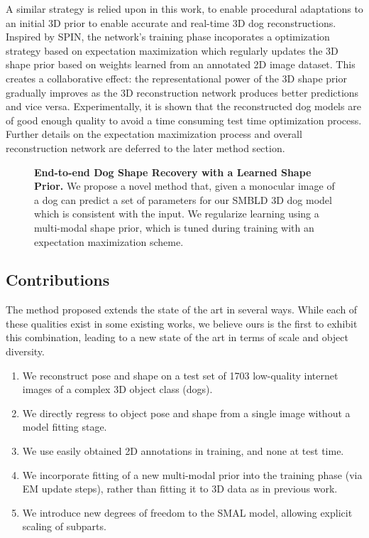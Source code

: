 A similar strategy is relied upon in this work, to enable procedural adaptations to an initial 3D prior to enable accurate and real-time 3D dog reconstructions. Inspired by SPIN, the network's training phase incoporates a optimization strategy based on expectation maximization which regularly updates the 3D shape prior based on weights learned from an annotated 2D image dataset. This creates a collaborative effect: the representational power of the 3D shape prior gradually improves as the 3D reconstruction network produces better predictions and vice versa. Experimentally, it is shown that the reconstructed dog models are of good enough quality to avoid a time consuming test time optimization process. Further details on the expectation maximization process and overall reconstruction network are deferred to the later method section.


\begin{figure}[t]
\medbreak
\caption{
\textbf{End-to-end Dog Shape Recovery with a Learned Shape Prior.}
We propose a novel method that, given a monocular image of a dog can predict a set of parameters for our SMBLD 3D dog model which is consistent with the input. We regularize learning using a multi-modal shape prior, which is tuned during training with an expectation maximization scheme.\label{fig:splash}}
\end{figure}

\subsection{Contributions}

The method proposed extends the state of the art in several ways.
While each of these qualities exist in some existing works, we believe ours is the first to exhibit this combination, leading to a new state of the art in terms of scale and object diversity.

\begin{enumerate}
    \item We reconstruct pose and shape on a test set of 1703 low-quality internet images of a complex 3D object class (dogs).
    \item We directly regress to object pose and shape from a single image without a model fitting stage.
    \item We use easily obtained 2D annotations in training, and none at test time.
    \item We incorporate fitting of a new multi-modal prior into the training phase (via EM update steps), rather than fitting it to 3D data as in previous work.
    \item We introduce new degrees of freedom to the SMAL model, 
    allowing explicit scaling of subparts.
\end{enumerate}

